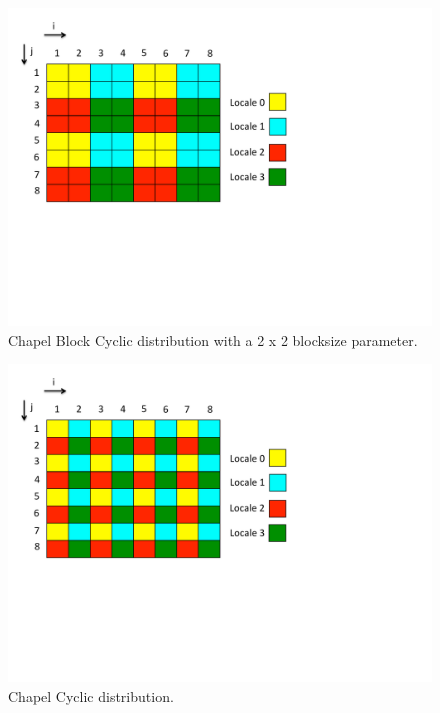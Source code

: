 \begin{figure}
	\begin{center}
	\includegraphics[scale=0.55]{./Figures/block_cyc_dist}
	\caption{Chapel Block Cyclic distribution with a 2 x 2 blocksize parameter.}
	\label{block_cyc_dist}
	\end{center}
\end{figure}

\begin{figure}
	\begin{center}
	\includegraphics[scale=0.55]{./Figures/cyc_dist}
	\caption{Chapel Cyclic distribution.}
	\label{cyc_dist}
	\end{center}
\end{figure}



